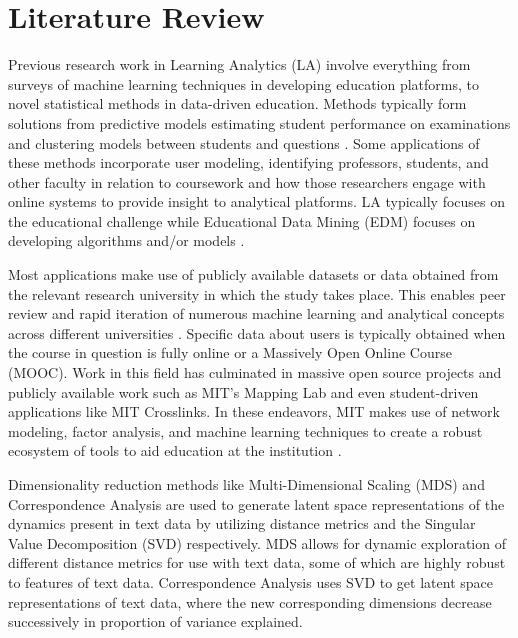 %
%
%

\chapter{Literature Review}
\label{literature-review}





\indent Previous research work in Learning Analytics (LA) involve everything from surveys of machine learning techniques in developing education platforms, to novel 
statistical methods in data-driven education. Methods typically form solutions from predictive models estimating student performance on examinations and clustering models 
between students and questions \cite{barbu_data_nodate}. Some applications of these methods incorporate user modeling, identifying professors, students, and other faculty in 
relation to coursework and how those researchers engage with online systems to provide insight to analytical platforms. LA typically focuses on the educational challenge while 
Educational Data Mining (EDM) focuses on developing algorithms and/or models \cite{hilliger_evaluating_2019}.

\indent Most applications make use of publicly available datasets  or data obtained from the relevant research university in which the 
study takes place. This enables peer review and rapid iteration of numerous machine learning and analytical concepts across different universities \cite{barbu_data_nodate}
\cite{romero_educational_2020}\cite{hilliger_evaluating_2019}.  Specific data about users is typically obtained when the course in question is fully online or a Massively 
Open Online Course (MOOC). Work in this field has culminated in massive open source projects and publicly available work such as MIT’s Mapping Lab and even student-driven 
applications like MIT Crosslinks. In these endeavors, MIT makes use of network modeling,  factor analysis, and machine learning techniques to 
create a robust ecosystem of tools to aid education at the institution \cite{willcox_network_2017}. 

Dimensionality reduction methods like Multi-Dimensional Scaling (MDS) \cite{jjs} and Correspondence Analysis are used to generate latent space representations of the dynamics 
present in text data by utilizing distance metrics and the Singular Value Decomposition (SVD) respectively.  MDS allows for dynamic exploration of different distance metrics 
for use with text data, some of which are highly robust to features of text data.  Correspondence Analysis uses SVD to get latent space representations of text data,  where 
the new corresponding dimensions decrease successively in proportion of variance explained. 

